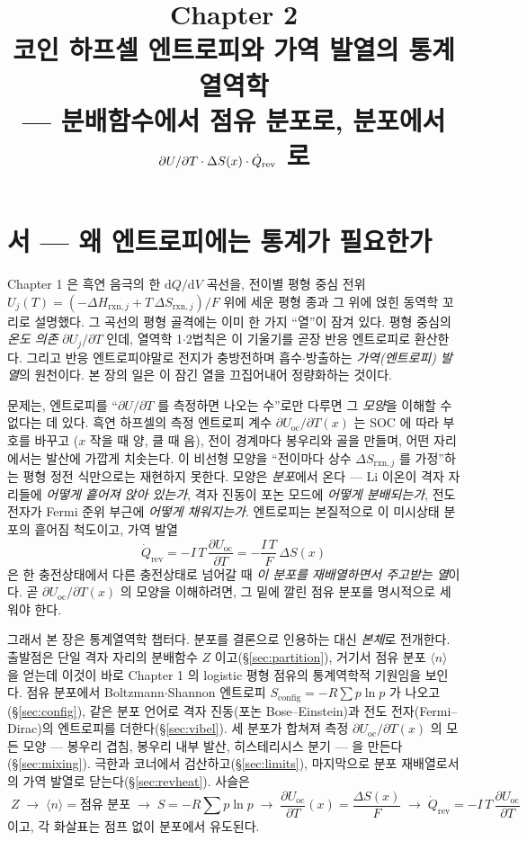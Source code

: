 \documentclass[11pt,a4paper]{article}
\title{\textbf{\LARGE Chapter 2}\\[0.35em]\Large 코인 하프셀 엔트로피와 가역 발열의 통계열역학\\[0.2em]\large — 분배함수에서 점유 분포로, 분포에서 $\partial U/\partial T\cdot\Delta S(x)\cdot\dot Q_\rev$ 로}
\author{}\date{}
\newcommand{\dd}{\mathrm{d}}
\newcommand{\rxn}{\mathrm{rxn}}
\newcommand{\rev}{\mathrm{rev}}
\newcommand{\oc}{\mathrm{oc}}
\newcommand{\config}{\mathrm{config}}
\newcommand{\avg}[1]{\langle #1\rangle}
\begin{document}
\maketitle

\section*{서 — 왜 엔트로피에는 통계가 필요한가}
Chapter 1 은 흑연 음극의 한 $\dd Q/\dd V$ 곡선을, 전이별 평형 중심 전위
$U_j(T)=(-\Delta H_{\rxn,j}+T\,\Delta S_{\rxn,j})/F$ 위에 세운 평형 종과 그 위에 얹힌 동역학 꼬리로
설명했다. 그 곡선의 평형 골격에는 이미 한 가지 ``열''이 잠겨 있다. 평형 중심의 \emph{온도 의존}
$\partial U_j/\partial T$ 인데, 열역학 1$\cdot$2법칙은 이 기울기를 곧장 반응 엔트로피로 환산한다. 그리고
반응 엔트로피야말로 전지가 충방전하며 흡수$\cdot$방출하는 \emph{가역(엔트로피) 발열}의 원천이다. 본 장의
일은 이 잠긴 열을 끄집어내어 정량화하는 것이다.

문제는, 엔트로피를 ``$\partial U/\partial T$ 를 측정하면 나오는 수''로만 다루면 그 \emph{모양}을 이해할 수
없다는 데 있다. 흑연 하프셀의 측정 엔트로피 계수 $\partial U_\oc/\partial T(x)$ 는 SOC 에 따라 부호를 바꾸고
($x$ 작을 때 양, 클 때 음), 전이 경계마다 봉우리와 골을 만들며, 어떤 자리에서는 발산에 가깝게 치솟는다. 이
비선형 모양을 ``전이마다 상수 $\Delta S_{\rxn,j}$ 를 가정''하는 평형 정전 식만으로는 재현하지 못한다. 모양은
\emph{분포}에서 온다 — Li 이온이 격자 자리들에 \emph{어떻게 흩어져 앉아 있는가}, 격자 진동이 포논 모드에
\emph{어떻게 분배되는가}, 전도 전자가 Fermi 준위 부근에 \emph{어떻게 채워지는가}. 엔트로피는 본질적으로
이 미시상태 분포의 흩어짐 척도이고, 가역 발열
\[
\dot Q_\rev=-I\,T\,\frac{\partial U_\oc}{\partial T}=-\frac{I\,T}{F}\,\Delta S(x)
\]
은 한 충전상태에서 다른 충전상태로 넘어갈 때 \emph{이 분포를 재배열하면서 주고받는 열}이다. 곧
$\partial U_\oc/\partial T(x)$ 의 모양을 이해하려면, 그 밑에 깔린 점유 분포를 명시적으로 세워야 한다.

그래서 본 장은 통계열역학 챕터다. 분포를 결론으로 인용하는 대신 \emph{본체}로 전개한다. 출발점은 단일 격자
자리의 분배함수 $Z$ 이고(\S\ref{sec:partition}), 거기서 점유 분포 $\avg{n}$ 을 얻는데 이것이 바로 Chapter 1
의 logistic 평형 점유의 통계역학적 기원임을 보인다. 점유 분포에서 Boltzmann$\cdot$Shannon 엔트로피
$S_\config=-R\sum p\ln p$ 가 나오고(\S\ref{sec:config}), 같은 분포 언어로 격자 진동(포논 Bose--Einstein)과
전도 전자(Fermi--Dirac)의 엔트로피를 더한다(\S\ref{sec:vibel}). 세 분포가 합쳐져 측정 $\partial U_\oc/\partial T(x)$
의 모든 모양 — 봉우리 겹침, 봉우리 내부 발산, 히스테리시스 분기 — 을 만든다
(\S\ref{sec:mixing}). 극한과 코너에서 검산하고(\S\ref{sec:limits}), 마지막으로 분포 재배열로서의 가역
발열로 닫는다(\S\ref{sec:revheat}). 사슬은
\[
\boxed{\;Z \;\to\; \avg{n}=\text{점유 분포}\;\to\; S=-R\textstyle\sum p\ln p \;\to\; \frac{\partial U_\oc}{\partial T}(x)=\frac{\Delta S(x)}{F}\;\to\;\dot Q_\rev=-I\,T\,\frac{\partial U_\oc}{\partial T}\;}
\]
이고, 각 화살표는 점프 없이 분포에서 유도된다.
\end{document}
